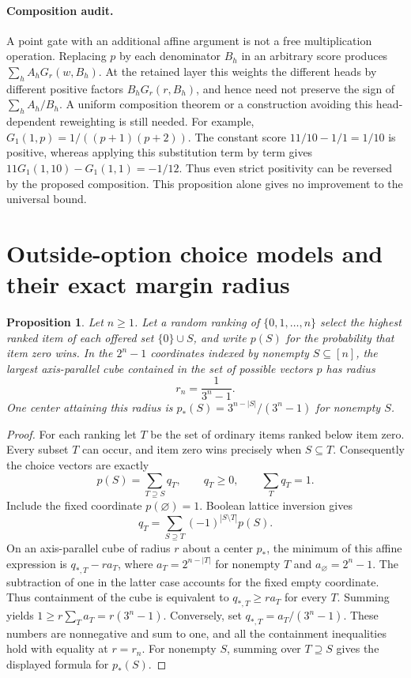 \documentclass[11pt]{article}
\newtheorem{proposition}{Proposition}
\begin{document}
\paragraph{Composition audit.}
A point gate with an additional affine argument is not a free
multiplication operation. Replacing $p$ by each denominator $B_h$
in an arbitrary score produces $\sum_h A_h G_r(w,B_h)$.
At the retained layer this weights the different heads by different
positive factors $B_hG_r(r,B_h)$, and hence need not preserve the
sign of $\sum_h A_h/B_h$. A uniform composition theorem or a
construction avoiding this head-dependent reweighting is still needed.
For example, $G_1(1,p)=1/((p+1)(p+2))$. The constant score
$11/10-1/1=1/10$ is positive, whereas applying this substitution
term by term gives $11G_1(1,10)-G_1(1,1)=-1/12$. Thus even
strict positivity can be reversed by the proposed composition.
This proposition alone gives no improvement to the universal bound.

\section{Outside-option choice models and their exact margin radius}

\begin{proposition}
Let $n\ge1$. Let a random ranking of $\{0,1,\ldots,n\}$ select the highest ranked
item of each offered set $\{0\}\cup S$, and write $p(S)$ for the
probability that item zero wins. In the $2^n-1$ coordinates indexed
by nonempty $S\subseteq[n]$, the largest axis-parallel cube contained
in the set of possible vectors $p$ has radius
\[
 r_n=\frac1{3^n-1}.
\]
One center attaining this radius is
$p_*(S)=3^{n-|S|}/(3^n-1)$ for nonempty $S$.
\end{proposition}
\begin{proof}
For each ranking let $T$ be the set of ordinary items ranked below
item zero. Every subset $T$ can occur, and item zero wins precisely
when $S\subseteq T$. Consequently the choice vectors are exactly
\[
 p(S)=\sum_{T\supseteq S}q_T,\qquad
 q_T\geq0,\qquad \sum_Tq_T=1.
\]
Include the fixed coordinate $p(\varnothing)=1$. Boolean lattice
inversion gives
\[
 q_T=\sum_{S\supseteq T}(-1)^{|S\setminus T|}p(S).
\]
On an axis-parallel cube of radius $r$ about a center $p_*$, the
minimum of this affine expression is $q_{*,T}-r a_T$, where
$a_T=2^{n-|T|}$ for nonempty $T$ and
$a_{\varnothing}=2^n-1$. The subtraction of one in the latter
case accounts for the fixed empty coordinate. Thus containment of
the cube is equivalent to $q_{*,T}\geq r a_T$ for every $T$.
Summing yields $1\geq r\sum_Ta_T=r(3^n-1)$.
Conversely, set $q_{*,T}=a_T/(3^n-1)$. These numbers are
nonnegative and sum to one, and all the containment inequalities
hold with equality at $r=r_n$. For nonempty $S$, summing over
$T\supseteq S$ gives the displayed formula for $p_*(S)$.
\end{proof}
\end{document}
